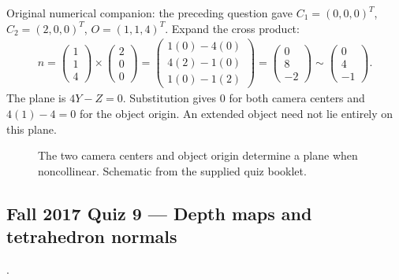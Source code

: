 \documentclass[letterpaper,11pt,english,openany,oneside]{jupyterBook}
\begin{document}
\sphinxAtStartPar
Original numerical companion: the preceding question gave {\color{QuizMathBlue} \(C_1=(0,0,0)^T\)}, {\color{QuizMathBlue} \(C_2=(2,0,0)^T\)}, {\color{QuizMathBlue} \(O=(1,1,4)^T\)}. Expand the cross product:
{\color{QuizMathBlue} \begin{equation*}
\begin{split}
n=\begin{pmatrix}1\\1\\4\end{pmatrix}\times\begin{pmatrix}2\\0\\0\end{pmatrix}
=\begin{pmatrix}1(0)-4(0)\\4(2)-1(0)\\1(0)-1(2)\end{pmatrix}
=\begin{pmatrix}0\\8\\-2\end{pmatrix}\sim\begin{pmatrix}0\\4\\-1\end{pmatrix}.
\end{split}
\end{equation*}}
\sphinxAtStartPar
The plane is {\color{QuizMathBlue} \(4Y-Z=0\)}. Substitution gives {\color{QuizMathBlue} \(0\)} for both camera centers and {\color{QuizMathBlue} \(4(1)-4=0\)} for the object origin. An extended object need not lie entirely on this plane.

\par

\begin{figure}[H]
\centering
\capstart

\noindent{}
\caption{The two camera centers and object origin determine a plane when noncollinear. Schematic from the supplied quiz booklet.}\label{\detokenize{lectures/lecture01/quiz-workbook:id1}}\end{figure}


\subsection{Fall 2017 Quiz 9 — Depth maps and tetrahedron normals}
\label{\detokenize{lectures/lecture01/quiz-workbook:fall-2017-quiz-9-depth-maps-and-tetrahedron-normals}}\label{\detokenize{lectures/lecture01/quiz-workbook:quiz-source-18}}
\sphinxAtStartPar
{} .
\end{document}
